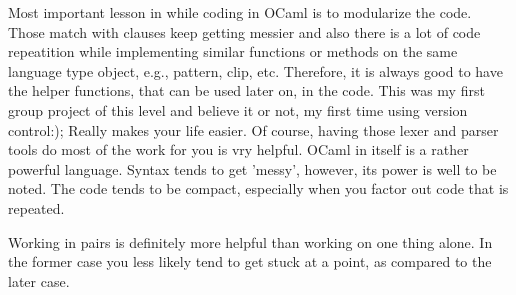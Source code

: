 Most important lesson in while coding in OCaml is to modularize the code.
Those match with clauses keep getting messier and also there is a lot of code 
repeatition while implementing similar functions or methods on the same language 
type object, e.g., pattern, clip, etc. Therefore, it is always good to have the 
helper functions, that can be used later on, in the code. This was my first group
project of this level and believe it or not, my first time using version control:); 
Really makes your life easier. Of course, having those lexer and parser tools do 
most of the work for you is vry helpful. OCaml in itself is a rather powerful language. 
Syntax tends to get 'messy', however, its power is well to be noted. The code tends 
to be compact, especially when you factor out code that is repeated.

Working in pairs is definitely more helpful than working on one thing alone. In the former
case you less likely tend to get stuck at a point, as compared to the later case. 

